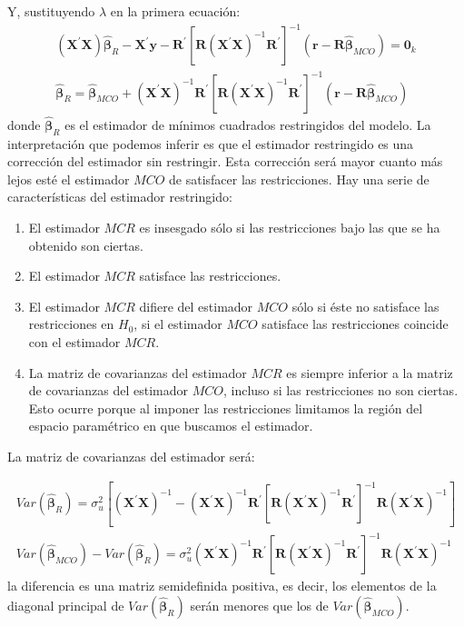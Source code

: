 Y, sustituyendo $\lambda$ en la primera ecuaci\'on:
\[
\begin{array}{c}
\left(\boldsymbol{X}^{\prime}\boldsymbol{X}\right)\hat{\boldsymbol{\beta}}_{R}-\boldsymbol{X}^{\prime}\boldsymbol{y}-\boldsymbol{R}^{\prime}\left[\boldsymbol{R}\left(\boldsymbol{X}^{\prime}\boldsymbol{X}\right)^{-1}\boldsymbol{R}^{\prime}\right]^{-1}\left(\boldsymbol{r}-\boldsymbol{R}\hat{\boldsymbol{\beta}}_{MCO}\right)=\boldsymbol{0}_{k}\\
\hat{\boldsymbol{\beta}}_{R}=\hat{\boldsymbol{\beta}}_{MCO}+\left(\boldsymbol{X}^{\prime}\boldsymbol{X}\right)^{-1}\boldsymbol{R}^{\prime}\left[\boldsymbol{R}\left(\boldsymbol{X}^{\prime}\boldsymbol{X}\right)^{-1}\boldsymbol{R}^{\prime}\right]^{-1}\left(\boldsymbol{r}-\boldsymbol{R}\hat{\boldsymbol{\beta}}_{MCO}\right)
\end{array}
\]
 donde $\hat{\boldsymbol{\beta}}_{R}$ es el estimador de m\'inimos
cuadrados restringidos del modelo. La interpretaci\'on que podemos inferir
es que el estimador restringido es una correcci\'on del estimador sin
restringir. Esta correcci\'on ser\'a mayor cuanto m\'as lejos est\'e el estimador
$MCO$ de satisfacer las restricciones. Hay una serie de caracter\'isticas
del estimador restringido:
\begin{enumerate}
\item El estimador $MCR$ es insesgado s\'olo si las restricciones bajo las
que se ha obtenido son ciertas.
\item El estimador $MCR$ satisface las restricciones.
\item El estimador $MCR$ difiere del estimador $MCO$ s\'olo si \'este no satisface
las restricciones en $H_{0}$, si el estimador $MCO$ satisface las
restricciones coincide con el estimador $MCR$.
\item La matriz de covarianzas del estimador $MCR$ es siempre inferior
a la matriz de covarianzas del estimador $MCO$, incluso si las restricciones
no son ciertas. Esto ocurre porque al imponer las restricciones limitamos
la regi\'on del espacio param\'etrico en que buscamos el estimador.
\end{enumerate}
La matriz de covarianzas del estimador ser\'a:

\[
\begin{array}{c}
Var(\hat{\boldsymbol{\beta}}_{R})=\sigma_{u}^{2}\left[\left(\boldsymbol{X}^{\prime}\boldsymbol{X}\right)^{-1}-\left(\boldsymbol{X}^{\prime}\boldsymbol{X}\right)^{-1}\boldsymbol{R}^{\prime}\left[\boldsymbol{R}\left(\boldsymbol{X}^{\prime}\boldsymbol{X}\right)^{-1}\boldsymbol{R}^{\prime}\right]^{-1}\boldsymbol{R}\left(\boldsymbol{X}^{\prime}\boldsymbol{X}\right)^{-1}\right]\\
Var(\hat{\boldsymbol{\beta}}_{MCO})-Var(\hat{\boldsymbol{\beta}}_{R})=\sigma_{u}^{2}\left(\boldsymbol{X}^{\prime}\boldsymbol{X}\right)^{-1}\boldsymbol{R}^{\prime}\left[\boldsymbol{R}\left(\boldsymbol{X}^{\prime}\boldsymbol{X}\right)^{-1}\boldsymbol{R}^{\prime}\right]^{-1}\boldsymbol{R}\left(\boldsymbol{X}^{\prime}\boldsymbol{X}\right)^{-1}
\end{array}
\]
 la diferencia es una matriz semidefinida positiva, es decir, los
elementos de la diagonal principal de $Var(\hat{\boldsymbol{\beta}}_{R})$
ser\'an menores que los de $Var(\hat{\boldsymbol{\beta}}_{MCO})$.


